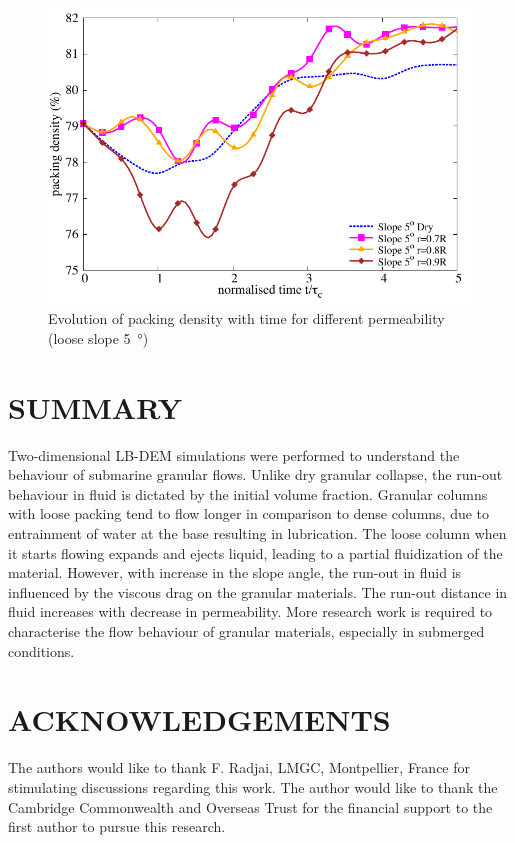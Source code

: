 \documentclass[12pt,a4paper,twocolumn,fleqn]{NARMS}
\begin{document}
\begin{figure}
\centering
\includegraphics[width=0.97\columnwidth]{figs/Voronoi_5.pdf}
\caption{Evolution of packing density with time for different permeability (loose slope \SI{5}{\degree})}
\label{fig:voro5}
\end{figure}

\section{SUMMARY}

Two-dimensional LB-DEM simulations were performed to understand the behaviour of submarine granular flows. Unlike dry granular collapse, the run-out behaviour in fluid is dictated by the initial volume fraction. Granular columns with loose packing tend to flow longer in comparison to dense columns, due to entrainment of water at the base resulting in lubrication. The loose column when it starts flowing expands and ejects liquid, leading to a partial fluidization of the material. However, with increase in the slope angle, the run-out in fluid is influenced by the viscous drag on the granular materials. The run-out distance in fluid increases with decrease in permeability. More research work is required to characterise the flow behaviour of granular materials, especially in submerged conditions.

\section*{ACKNOWLEDGEMENTS}
The authors would like to thank F. Radjai, LMGC, Montpellier, France for stimulating discussions regarding this work. The author would like to thank the Cambridge Commonwealth and Overseas Trust for the financial support to the first author to pursue this research.



\end{document}
